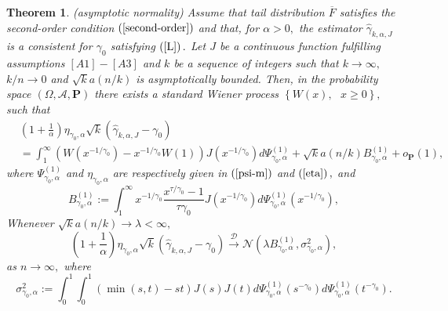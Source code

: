 \documentclass[12pt,reqno,openbib,runningheads,a4paper,portrait]{amsart}%
\newtheorem{theorem}{Theorem}[section]
\begin{document}
\begin{theorem}
\textbf{\label{Theorem2}}(asymptotic normality) Assume that tail distribution
$\overline{F}$ satisfies the second-order condition $\left(
\ref{second-order}\right)  $ and that, for $\alpha>0,$ the estimator
$\widehat{\gamma}_{k,\alpha,J}$ is a consistent for $\gamma_{0}$ satisfying
$\left(  \ref{L}\right)  .$ Let $J$ be a continuous function fulfilling
assumptions $\left[  A1\right]  -\left[  A3\right]  $ and $k$ be a sequence of
integers such that $k\rightarrow\infty,$ $k/n\rightarrow0$ and $\sqrt
{k}a\left(  n/k\right)  $ is asymptotically bounded. Then, in the probability
space $\left(  \Omega,\mathcal{A},\mathbf{P}\right)  $ there exists a standard
Wiener process $\left\{  W\left(  x\right)  ,\text{ }x\geq0\right\}  ,$ such
that
\begin{align*}
&  \left(  1+\frac{1}{\alpha}\right)  \eta_{\gamma_{0},\alpha}\sqrt{k}\left(
\widehat{\gamma}_{k,\alpha,J}-\gamma_{0}\right) \\
&  =\int_{1}^{\infty}\left(  W\left(  x^{-1/\gamma_{0}}\right)  -x^{-1/\gamma
_{0}}W\left(  1\right)  \right)  J\left(  x^{-1/\gamma_{0}}\right)
d\Psi_{\gamma_{0},\alpha}^{\left(  1\right)  }+\sqrt{k}a\left(  n/k\right)
B_{\gamma_{0},\alpha}^{\left(  1\right)  }+o_{\mathbf{P}}\left(  1\right)  ,
\end{align*}
where $\Psi_{\gamma_{0},\alpha}^{\left(  1\right)  }$ and $\eta_{\gamma
_{0},\alpha}$ are respectively given in $\left(  \ref{psi-m}\right)  $ and
$\left(  \ref{eta}\right)  ,$ and
\[
B_{\gamma_{0},\alpha}^{\left(  1\right)  }:=\int_{1}^{\infty}x^{-1/\gamma_{0}%
}\frac{x^{\tau/\gamma_{0}}-1}{\tau\gamma_{0}}J\left(  x^{-1/\gamma_{0}%
}\right)  d\Psi_{\gamma_{0},\alpha}^{\left(  1\right)  }\left(  x^{-1/\gamma
_{0}}\right)  ,
\]
Whenever $\sqrt{k}a\left(  n/k\right)  \rightarrow\lambda<\infty,$
\[
\left(  1+\frac{1}{\alpha}\right)  \eta_{\gamma_{0},\alpha}\sqrt{k}\left(
\widehat{\gamma}_{k,\alpha,J}-\gamma_{0}\right)  \overset{\mathcal{D}%
}{\rightarrow}\mathcal{N}\left(  \lambda B_{\gamma_{0},\alpha}^{\left(
1\right)  },\sigma_{\gamma_{0},\alpha}^{2}\right)  ,
\]
as $n\rightarrow\infty,$ where%
\[
\sigma_{\gamma_{0},\alpha}^{2}:=%
{\displaystyle\int_{0}^{1}}
{\displaystyle\int_{0}^{1}}
\left(  \min\left(  s,t\right)  -st\right)  J\left(  s\right)  J\left(
t\right)  d\Psi_{\gamma_{0},\alpha}^{\left(  1\right)  }\left(  s^{-\gamma
_{0}}\right)  d\Psi_{\gamma_{0},\alpha}^{\left(  1\right)  }\left(
t^{-\gamma_{0}}\right)  .
\]

\end{theorem}
\end{document}
